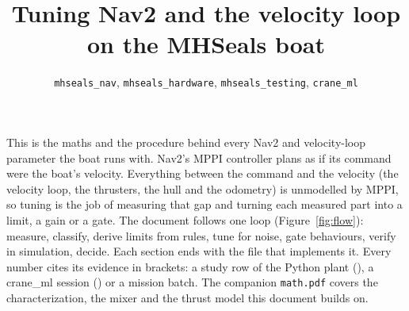 \documentclass[11pt]{article}
\title{Tuning Nav2 and the velocity loop on the MHSeals boat}
\author{\texttt{mhseals\_nav}, \texttt{mhseals\_hardware}, \texttt{mhseals\_testing}, \texttt{crane\_ml}}
\date{}
\begin{document}
\maketitle

\noindent This is the maths and the procedure behind every Nav2 and velocity-loop
parameter the boat runs with. Nav2's MPPI controller plans as if its command were the
boat's velocity. Everything between the command and the velocity (the velocity loop,
the thrusters, the hull and the odometry) is unmodelled by MPPI, so tuning is the job of
measuring that gap and turning each measured part into a limit, a gain or a gate. The
document follows one loop (Figure~\ref{fig:flow}): measure, classify, derive limits from
rules, tune for noise, gate behaviours, verify in simulation, decide. Each section ends with
the file that implements it. Every number cites its evidence in brackets: a study row of
the Python plant (), a crane\_ml session
() or a mission batch. The companion \texttt{math.pdf} covers the
characterization, the mixer and the thrust model this document builds on.

\tableofcontents
\bigskip











\appendix

\end{document}
